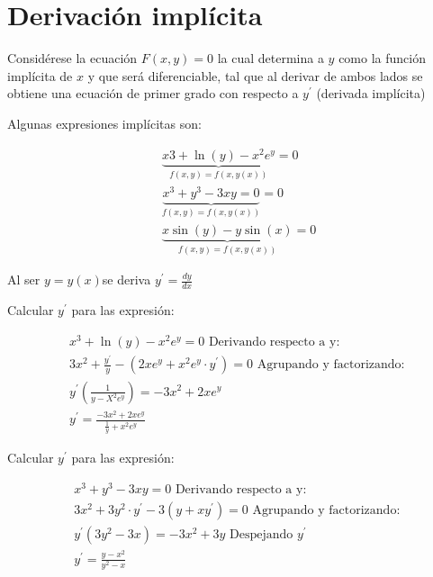 \section{Derivación implícita}

Considérese la ecuación $F(x,y)=0$ la cual determina a $y$ como la función implícita de $x$
y que será diferenciable, tal que al derivar de ambos lados se obtiene una ecuación de primer grado
con respecto a  $y^{\prime}$ (derivada implícita)

Algunas expresiones implícitas son:

\begin{align*}
	 & \underbrace{x3+\ln(y)-x^2e^y}_{f(x,y)=f(x,y(x))}=0  \\
	 & \underbrace{x^3+y^3-3xy=0}_{f(x,y)=f(x,y(x))} =0    \\
	 & \underbrace{x\sin(y)-y\sin(x)}_{f(x,y)=f(x,y(x))}=0
\end{align*}

\begin{remark}
	Al ser $y=y(x)$se deriva $y^{\prime}=\frac{dy}{dx}$
\end{remark}

\begin{example}
	Calcular $y^{\prime}$ para las expresión:

	\begin{align*}
		 & x^3+\ln(y)-x^2e^y=0\text{ Derivando respecto a y: }                                                      \\
		 & 3x^2+\frac{y^{\prime}}{y}-\left(2xe^y+x^2e^y\cdot y^{\prime}\right)=0 \text{ Agrupando y factorizando: } \\
		 & y^{\prime}\left(\frac{1}{y-X^2e^y} \right)=-3x^2+2xe^y                                                   \\
		 & y^{\prime}=\frac{-3x^2+2xe^y}{\frac{1}{y}+x^2e^y}
	\end{align*}
\end{example}

\begin{example}
	Calcular $y^{\prime}$ para las expresión:

	\begin{align*}
		 & x^3+y^3-3xy=0 \text{ Derivando respecto a y: }                                             \\
		 & 3x^2+3y^2\cdot y^{\prime}-3\left(y+xy^{\prime}\right)=0 \text{ Agrupando y factorizando: } \\
		 & y^{\prime}\left(3y^2-3x\right)=-3x^2+3y \text{ Despejando }y^{\prime}                      \\
		 & y^{\prime}=\frac{y-x^2}{y^2-x}
	\end{align*}
\end{example}

